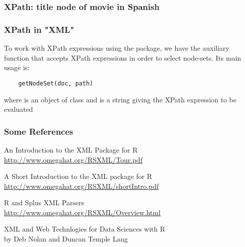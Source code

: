 \documentclass[12pt]{beamer}\usepackage[]{graphicx}\usepackage[]{color}
\begin{document}
\begin{frame}
\frametitle{XPath: title node of movie in Spanish}
\begin{center}
\end{center}
\end{frame}


\begin{frame}
\begin{center}
\Huge{}
\end{center}
\end{frame}


\begin{frame}[fragile]
\frametitle{XPath in "XML"}

To work with XPath expressions using the  package, we have the auxiliary function {\hilit {}} that accepts XPath expressions in order to 
select node-sets. Its main usage is:
\begin{verbatim}
    getNodeSet(doc, path)
\end{verbatim}
\eb

where {\hilit {}} is an object of class  and {\hilit {}} is a string giving the XPath expression to be evaluated

\end{frame}


\begin{frame}
\frametitle{Some References}

\bi
 \item An Introduction to the XML Package for R \\
{\scriptsize \url{http://www.omegahat.org/RSXML/Tour.pdf}}
 \item A Short Introduction to the XML package for R \\
{\scriptsize \url{http://www.omegahat.org/RSXML/shortIntro.pdf}}
 \item R and Splus XML Parsers \\
 {\scriptsize \url{http://www.omegahat.org/RSXML/Overview.html}}
 \item XML and Web Technlogies for Data Sciences with R \\
 by Deb Nolan and Duncan Temple Lang
\ei

\end{frame}

\end{document}
